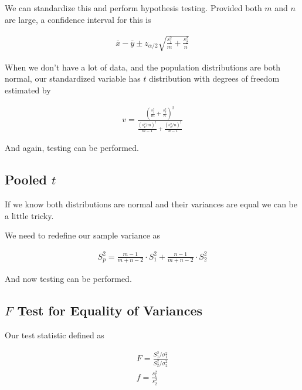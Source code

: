 We can standardize this and perform hypothesis testing. Provided both $m$ and $n$ are large, a confidence interval for
this is

\begin{equation*}
    \begin{aligned}
        \overline{x} - \overline{y} \pm z_{\alpha / 2} \sqrt{\frac{s^2_1}{m} + \frac{s^2_2}{n}}
    \end{aligned}
\end{equation*}

When we don't have a lot of data, and the population distributions are both normal, our standardized variable has $t$
distribution with degrees of freedom estimated by

\begin{equation*}
    \begin{aligned}
        v = \frac{{\left( \frac{s^2_1}{m} + \frac{s^2_2}{n} \right)}^2}
        {\frac{{\left( s^2_1 / m \right)}^2}{m - 1} + \frac{{\left( s^2_2 / n \right)}^2}{n - 1}}
    \end{aligned}
\end{equation*}
    
And again, testing can be performed.

    \subsection{Pooled $t$}
    If we know both distributions are normal and their variances are equal we can be a little tricky.

    We need to redefine our sample variance as

    \begin{equation*}
        \begin{aligned}
            S^2_p = \frac{m - 1}{m + n - 2} \cdot S^2_1 + \frac{n - 1}{m + n - 2} \cdot S^2_2
        \end{aligned}
    \end{equation*}

    And now testing can be performed.

    \subsection{$F$ Test for Equality of Variances}
    Our test statistic defined as

    \begin{equation*}
        \begin{aligned}
            F = \frac{S_1^2 / \sigma^2_1}{S_2^2/\sigma_2^2}\\
            f = \frac{s^2_1}{s^2_2}
        \end{aligned}
    \end{equation*}

